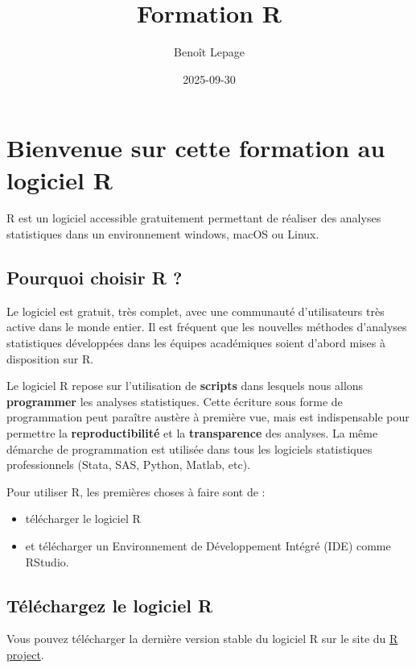 \documentclass[
]{book}
\title{Formation R}
\author{Benoît Lepage}
\date{2025-09-30}
\providecommand{\tightlist}{%
  \setlength{\itemsep}{0pt}\setlength{\parskip}{0pt}}
\begin{document}
\maketitle

{
\setcounter{tocdepth}{1}
\tableofcontents
}
\chapter{Bienvenue sur cette formation au logiciel R}\label{bienvenue-sur-cette-formation-au-logiciel-r}

R est un logiciel accessible gratuitement permettant de réaliser des analyses statistiques dans un environnement windows, macOS ou Linux.

\section{Pourquoi choisir R ?}\label{pourquoi-choisir-r}

Le logiciel est gratuit, très complet, avec une communauté d'utilisateurs très active dans le monde entier. Il est fréquent que les nouvelles méthodes d'analyses statistiques développées dans les équipes académiques soient d'abord mises à disposition sur R.

Le logiciel R repose sur l'utilisation de \textbf{scripts} dans lesquels nous allons \textbf{programmer} les analyses statistiques. Cette écriture sous forme de programmation peut paraître austère à première vue, mais est indispensable pour permettre la \textbf{reproductibilité} et la \textbf{transparence} des analyses. La même démarche de programmation est utilisée dans tous les logiciels statistiques professionnels (Stata, SAS, Python, Matlab, etc).

Pour utiliser R, les premières choses à faire sont de :

\begin{itemize}
\tightlist
\item
  télécharger le logiciel R
\item
  et télécharger un Environnement de Développement Intégré (IDE) comme RStudio.
\end{itemize}

\section{Téléchargez le logiciel R}\label{tuxe9luxe9chargez-le-logiciel-r}

Vous pouvez télécharger la dernière version stable du logiciel R sur le site du \href{https://www.r-project.org/}{R project}.
\end{document}
